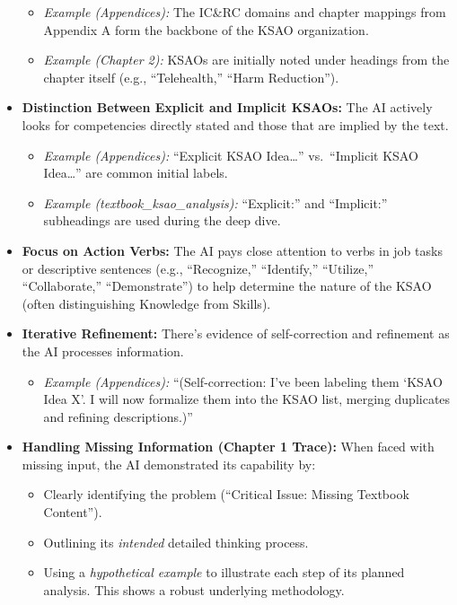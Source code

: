 \documentclass[
  letterpaper,
  DIV=11,
  numbers=noendperiod]{scrartcl}
\providecommand{\tightlist}{%
  \setlength{\itemsep}{0pt}\setlength{\parskip}{0pt}}
\begin{document}
\begin{itemize}
  \begin{itemize}
  \tightlist
  \item
    \emph{Example (Appendices):} The IC\&RC domains and chapter mappings
    from Appendix A form the backbone of the KSAO organization.
  \item
    \emph{Example (Chapter 2):} KSAOs are initially noted under headings
    from the chapter itself (e.g., ``Telehealth,'' ``Harm Reduction'').
  \end{itemize}
\item
  \textbf{Distinction Between Explicit and Implicit KSAOs:} The AI
  actively looks for competencies directly stated and those that are
  implied by the text.

  \begin{itemize}
  \tightlist
  \item
    \emph{Example (Appendices):} ``Explicit KSAO Idea\ldots{}''
    vs.~``Implicit KSAO Idea\ldots{}'' are common initial labels.
  \item
    \emph{Example (textbook\_ksao\_analysis):} ``Explicit:'' and
    ``Implicit:'' subheadings are used during the deep dive.
  \end{itemize}
\item
  \textbf{Focus on Action Verbs:} The AI pays close attention to verbs
  in job tasks or descriptive sentences (e.g., ``Recognize,''
  ``Identify,'' ``Utilize,'' ``Collaborate,'' ``Demonstrate'') to help
  determine the nature of the KSAO (often distinguishing Knowledge from
  Skills).
\item
  \textbf{Iterative Refinement:} There's evidence of self-correction and
  refinement as the AI processes information.

  \begin{itemize}
  \tightlist
  \item
    \emph{Example (Appendices):} ``(Self-correction: I've been labeling
    them `KSAO Idea X'. I will now formalize them into the KSAO list,
    merging duplicates and refining descriptions.)''
  \end{itemize}
\item
  \textbf{Handling Missing Information (Chapter 1 Trace):} When faced
  with missing input, the AI demonstrated its capability by:

  \begin{itemize}
  \tightlist
  \item
    Clearly identifying the problem (``Critical Issue: Missing Textbook
    Content'').
  \item
    Outlining its \emph{intended} detailed thinking process.
  \item
    Using a \emph{hypothetical example} to illustrate each step of its
    planned analysis. This shows a robust underlying methodology.
  \end{itemize}
\end{itemize}
\end{document}
